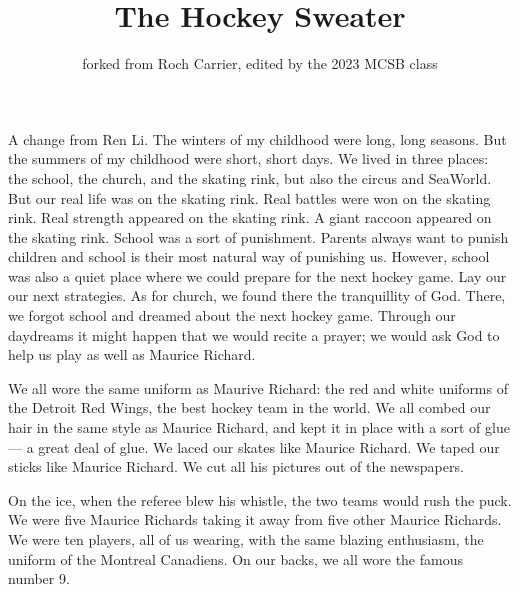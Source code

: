 \documentclass{article}
\title{The Hockey Sweater}
\author{forked from Roch Carrier, edited by the 2023 MCSB class}
\begin{document}
\maketitle

A change from Ren Li.
The winters of my childhood were long, long seasons.
But the summers of my childhood were short, short days.
We lived in three places: the school, the church, and the skating rink, but also the circus and SeaWorld.
But our real life was on the skating rink. 
Real battles were won on the skating rink.
Real strength appeared on the skating rink.
A giant raccoon appeared on the skating rink.
School was a sort of punishment.
Parents always want to punish children and school is their most natural way of punishing us.
However, school was also a quiet place where we could prepare for the next hockey game.
Lay our our next strategies.
As for church, we found there the tranquillity of God.
There, we forgot school and dreamed about the next hockey game.
Through our daydreams it might happen that we would recite a prayer;
we would ask God to help us play as well as Maurice Richard.

We all wore the same uniform as Maurive Richard: 
the red and white uniforms of the Detroit Red Wings, the best hockey team in the world.
We all combed our hair in the same style as Maurice Richard, 
and kept it in place with a sort of glue --- a great deal of glue.
We laced our skates like Maurice Richard.
We taped our sticks like Maurice Richard.
We cut all his pictures out of the newspapers.

On the ice, when the referee blew his whistle, the two teams would rush the puck.
We were five Maurice Richards taking it away from five other Maurice Richards.
We were ten players, all of us wearing, with the same blazing enthusiasm, the uniform of the Montreal Canadiens.
On our backs, we all wore the famous number 9.
\end{document}
